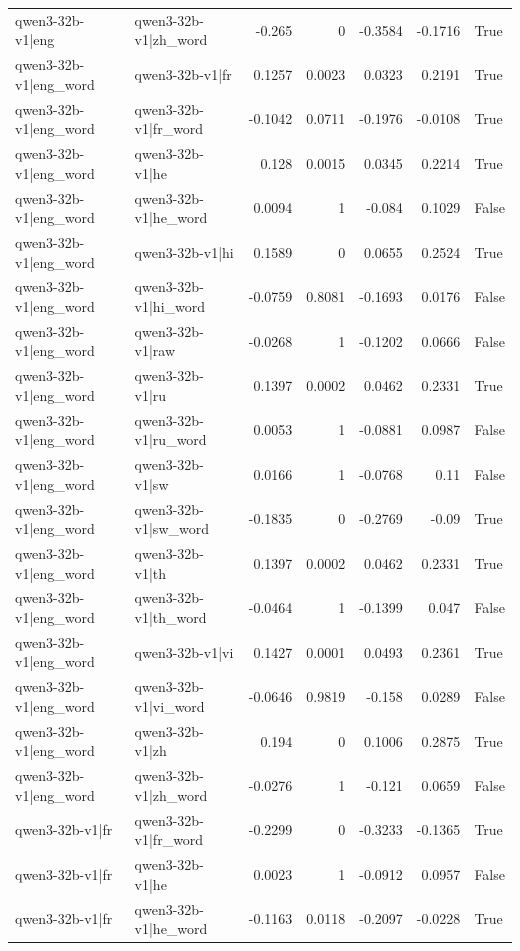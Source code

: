 \begin{table}
\begin{tabular}{l l r r r r l}
qwen3-32b-v1|eng & qwen3-32b-v1|zh_word & -0.265 & 0 & -0.3584 & -0.1716 & True \\
qwen3-32b-v1|eng_word & qwen3-32b-v1|fr & 0.1257 & 0.0023 & 0.0323 & 0.2191 & True \\
qwen3-32b-v1|eng_word & qwen3-32b-v1|fr_word & -0.1042 & 0.0711 & -0.1976 & -0.0108 & True \\
qwen3-32b-v1|eng_word & qwen3-32b-v1|he & 0.128 & 0.0015 & 0.0345 & 0.2214 & True \\
qwen3-32b-v1|eng_word & qwen3-32b-v1|he_word & 0.0094 & 1 & -0.084 & 0.1029 & False \\
qwen3-32b-v1|eng_word & qwen3-32b-v1|hi & 0.1589 & 0 & 0.0655 & 0.2524 & True \\
qwen3-32b-v1|eng_word & qwen3-32b-v1|hi_word & -0.0759 & 0.8081 & -0.1693 & 0.0176 & False \\
qwen3-32b-v1|eng_word & qwen3-32b-v1|raw & -0.0268 & 1 & -0.1202 & 0.0666 & False \\
qwen3-32b-v1|eng_word & qwen3-32b-v1|ru & 0.1397 & 0.0002 & 0.0462 & 0.2331 & True \\
qwen3-32b-v1|eng_word & qwen3-32b-v1|ru_word & 0.0053 & 1 & -0.0881 & 0.0987 & False \\
qwen3-32b-v1|eng_word & qwen3-32b-v1|sw & 0.0166 & 1 & -0.0768 & 0.11 & False \\
qwen3-32b-v1|eng_word & qwen3-32b-v1|sw_word & -0.1835 & 0 & -0.2769 & -0.09 & True \\
qwen3-32b-v1|eng_word & qwen3-32b-v1|th & 0.1397 & 0.0002 & 0.0462 & 0.2331 & True \\
qwen3-32b-v1|eng_word & qwen3-32b-v1|th_word & -0.0464 & 1 & -0.1399 & 0.047 & False \\
qwen3-32b-v1|eng_word & qwen3-32b-v1|vi & 0.1427 & 0.0001 & 0.0493 & 0.2361 & True \\
qwen3-32b-v1|eng_word & qwen3-32b-v1|vi_word & -0.0646 & 0.9819 & -0.158 & 0.0289 & False \\
qwen3-32b-v1|eng_word & qwen3-32b-v1|zh & 0.194 & 0 & 0.1006 & 0.2875 & True \\
qwen3-32b-v1|eng_word & qwen3-32b-v1|zh_word & -0.0276 & 1 & -0.121 & 0.0659 & False \\
qwen3-32b-v1|fr & qwen3-32b-v1|fr_word & -0.2299 & 0 & -0.3233 & -0.1365 & True \\
qwen3-32b-v1|fr & qwen3-32b-v1|he & 0.0023 & 1 & -0.0912 & 0.0957 & False \\
qwen3-32b-v1|fr & qwen3-32b-v1|he_word & -0.1163 & 0.0118 & -0.2097 & -0.0228 & True \\

\end{tabular}
\end{table}
